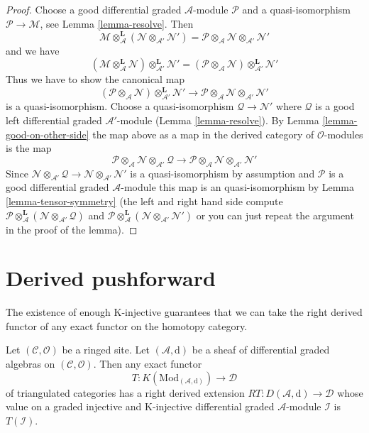 \begin{proof}
Choose a good differential graded $\mathcal{A}$-module
$\mathcal{P}$ and a quasi-isomorphism $\mathcal{P} \to \mathcal{M}$, see
Lemma \ref{lemma-resolve}. Then
$$
\mathcal{M}
\otimes_\mathcal{A}^\mathbf{L}
(\mathcal{N} \otimes_{\mathcal{A}'} \mathcal{N}') =
\mathcal{P} \otimes_\mathcal{A} \mathcal{N}
\otimes_{\mathcal{A}'} \mathcal{N}'
$$
and we have
$$
(\mathcal{M}
\otimes_\mathcal{A}^\mathbf{L} \mathcal{N})
\otimes_{\mathcal{A}'}^\mathbf{L} \mathcal{N}' =
(\mathcal{P} \otimes_\mathcal{A} \mathcal{N})
\otimes_{\mathcal{A}'}^\mathbf{L} \mathcal{N}'
$$
Thus we have to show the canonical map
$$
(\mathcal{P} \otimes_\mathcal{A} \mathcal{N})
\otimes_{\mathcal{A}'}^\mathbf{L} \mathcal{N}'
\longrightarrow
\mathcal{P} \otimes_\mathcal{A} \mathcal{N}
\otimes_{\mathcal{A}'} \mathcal{N}'
$$
is a quasi-isomorphism. Choose a quasi-isomorphism
$\mathcal{Q} \to \mathcal{N}'$ where $\mathcal{Q}$
is a good left differential graded $\mathcal{A}'$-module
(Lemma \ref{lemma-resolve}).
By Lemma \ref{lemma-good-on-other-side} the map
above as a map in the derived category of $\mathcal{O}$-modules is the map
$$
\mathcal{P} \otimes_\mathcal{A} \mathcal{N}
\otimes_{\mathcal{A}'} \mathcal{Q}
\longrightarrow
\mathcal{P} \otimes_\mathcal{A} \mathcal{N}
\otimes_{\mathcal{A}'} \mathcal{N}'
$$
Since $\mathcal{N} \otimes_{\mathcal{A}'} \mathcal{Q} \to
\mathcal{N} \otimes_{\mathcal{A}'} \mathcal{N}'$ is a quasi-isomorphism
by assumption and $\mathcal{P}$ is a good differential graded
$\mathcal{A}$-module this map is an quasi-isomorphism by
Lemma \ref{lemma-tensor-symmetry} (the left and right hand side
compute $\mathcal{P} \otimes_\mathcal{A}^\mathbf{L} (\mathcal{N}
\otimes_{\mathcal{A}'} \mathcal{Q})$ and
$\mathcal{P} \otimes_\mathcal{A}^\mathbf{L} (\mathcal{N}
\otimes_{\mathcal{A}'} \mathcal{N}')$ or you can just repeat
the argument in the proof of the lemma).
\end{proof}






\section{Derived pushforward}
\label{section-derived-pushforward}

\noindent
The existence of enough K-injective guarantees that we can take the right
derived functor of any exact functor on the homotopy category.

\begin{lemma}
\label{lemma-right-derived}
Let $(\mathcal{C}, \mathcal{O})$ be a ringed site.
Let $(\mathcal{A}, \text{d})$ be a sheaf of differential graded algebras on
$(\mathcal{C}, \mathcal{O})$. Then any exact functor
$$
T : K(\text{Mod}_{(\mathcal{A}, \text{d})}) \longrightarrow \mathcal{D}
$$
of triangulated categories has a right derived extension
$RT : D(\mathcal{A}, \text{d}) \to \mathcal{D}$
whose value on a graded injective and K-injective
differential graded $\mathcal{A}$-module $\mathcal{I}$
is $T(\mathcal{I})$.
\end{lemma}

